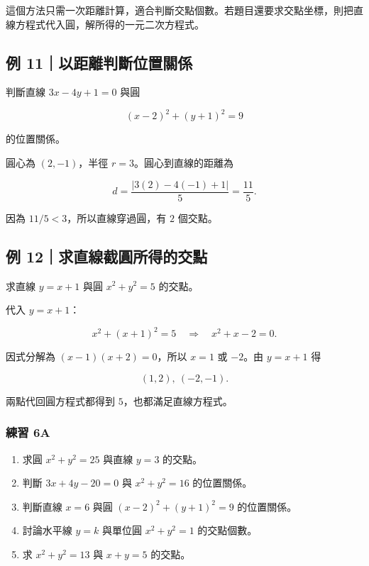 \documentclass[11pt,a4paper]{article}
\providecommand{\tightlist}{%
  \setlength{\itemsep}{0pt}\setlength{\parskip}{0pt}}
\begin{document}
這個方法只需一次距離計算，適合判斷交點個數。若題目還要求交點坐標，則把直線方程式代入圓，解所得的一元二次方程式。

\subsection{例 11｜以距離判斷位置關係}\label{ux4f8b-11ux4ee5ux8dddux96e2ux5224ux65b7ux4f4dux7f6eux95dcux4fc2}

判斷直線 \(3x-4y+1=0\) 與圓

\[
(x-2)^2+(y+1)^2=9
\]

的位置關係。

圓心為 \((2,-1)\)，半徑 \(r=3\)。圓心到直線的距離為

\[
d=\frac{|3(2)-4(-1)+1|}{5}=\frac{11}{5}.
\]

因為 \(11/5<3\)，所以直線穿過圓，有 \(\boxed{2\text{ 個交點}}\)。

\subsection{例 12｜求直線截圓所得的交點}\label{ux4f8b-12ux6c42ux76f4ux7ddaux622aux5713ux6240ux5f97ux7684ux4ea4ux9ede}

求直線 \(y=x+1\) 與圓 \(x^2+y^2=5\) 的交點。

代入 \(y=x+1\)：

\[
x^2+(x+1)^2=5
\quad\Longrightarrow\quad
x^2+x-2=0.
\]

因式分解為 \((x-1)(x+2)=0\)，所以 \(x=1\) 或 \(-2\)。由 \(y=x+1\) 得

\[
\boxed{(1,2),\ (-2,-1)}.
\]

兩點代回圓方程式都得到 \(5\)，也都滿足直線方程式。

\subsubsection{練習 6A}\label{ux7df4ux7fd2-6a}

\begin{enumerate}
\def\labelenumi{\arabic{enumi}.}
\tightlist
\item
  求圓 \(x^2+y^2=25\) 與直線 \(y=3\) 的交點。
\item
  判斷 \(3x+4y-20=0\) 與 \(x^2+y^2=16\) 的位置關係。
\item
  判斷直線 \(x=6\) 與圓 \((x-2)^2+(y+1)^2=9\) 的位置關係。
\item
  討論水平線 \(y=k\) 與單位圓 \(x^2+y^2=1\) 的交點個數。
\item
  求 \(x^2+y^2=13\) 與 \(x+y=5\) 的交點。
\end{enumerate}
\end{document}

